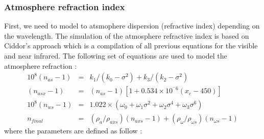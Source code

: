 \subsubsection{Atmosphere refraction index}
First, we need to model to atsmophere dispersion (refractive index) depending on the wavelength. The simulation of the atmosphere refractive index is based on Ciddor's approach \cite{Ciddor} which is a compilation of all previous equations for the visible and near infrared. The following set of equations are used to model the atmosphere refraction :
\begin{eqnarray}
	10^8 \left(n_{as}-1\right) &= &k_1/\left(k_0-\sigma ^2\right)+k_3/\left(k_2-\sigma ^2\right)\\
	\left(n_{asx}-1\right) &= &\left(n_{as}-1\right) \left[1+0.534\times 10^{^-6}\left(x_c-450\right)\right] \label{eq:nasx}\\
		10^8 \left(n_{ws}-1\right) &= &1.022\times\left(\omega_0+\omega_1\sigma^2+\omega_2\sigma^4+\omega_3\sigma^6\right)\\
		n_{final} &= &\left(\rho_a / \rho_{axs}\right)\left(n_{axs}-1\right)+\left(\rho_\omega / \rho_{\omega s}\right)\left(n_{\omega s}-1\right)
\end{eqnarray}
where the parameters are defined as follow :
